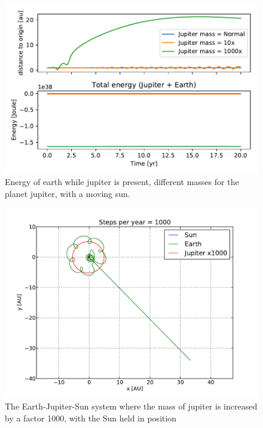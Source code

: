 \documentclass[10pt]{article}
\begin{document}
\begin{multicols}{2}
\begin{figure}[htpb]
    \centering
    \includegraphics[width=0.8\linewidth]{energyEarthJupiter1.pdf}
    \caption{Energy of earth while jupiter is present, different masses for
        the planet jupiter, with a moving sun.  }
    \label{fig:energyEarthJupiter2}
\end{figure}

\begin{figure}[H]
    \centering
    \includegraphics[width=1.0\linewidth]{../results/EJSx1000_2.pdf}
    \caption{The Earth-Jupiter-Sun system where the mass of jupiter is
    increased by a factor 1000, with the Sun held in position}
    \label{fig:jupiter1000x2}
\end{figure}


\end{multicols}
\end{document}
